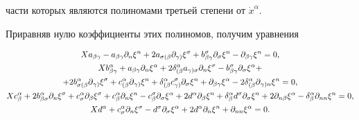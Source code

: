 части которых являются полиномами третьей степени от $\Dot x^\alpha$.


Приравняв нулю коэффициенты этих полиномов, получим уравнения


\begin{gather}


Xa_{\beta\gamma}-a_{\beta\gamma}\partial_n\xi^n


+2a_{\sigma(\beta}\partial_{\gamma)}\xi^\sigma


+b^\sigma_{\beta\gamma}\partial_\sigma\xi^n


-\partial_{\beta\gamma}\xi^n=0,\notag \\


%


Xb^{\alpha}_{\beta\gamma}+


a_{\beta\gamma}\partial_n\xi^{\alpha}+


2\delta^{\alpha}_{(\beta}a_{\gamma)\sigma}\partial_n\xi^\sigma-


b^{\sigma}_{\beta\gamma}\partial_{\sigma}\xi^{\alpha}+\notag \\


%


\label{b2}


+2b{}^\alpha_{\sigma(\beta}\partial{}_{\gamma)}\xi^\sigma+


c{}^{\alpha}_{(\beta}\partial{}_{\gamma)}\xi^n


+\delta{}^\alpha_{(\beta}c{}_{\gamma)}^{\sigma}\partial_{\sigma}\xi^n+


\partial_{\beta\gamma}\xi^{\alpha}


-2\delta{}^{\alpha}_{(\beta}\partial{}_{\gamma)n}\xi^n=0, \\


%


Xc^{\alpha}_{\beta}+2b^{\alpha}_{\beta\sigma}\partial_{n}\xi^{\sigma}+


c^{\alpha}_{\sigma}\partial_{\beta}\xi^{\sigma}+


c^{\alpha}_{\beta}\partial_{n}\xi^{n}-


c^{\sigma}_{\beta}\partial_{\sigma}\xi^{\alpha}


+2d^{\alpha}\partial_{\beta}\xi^{n}+


\delta^{\alpha}_{\beta}d^{\sigma}\partial_{\sigma}\xi^{n}+


2\partial_{n\beta}\xi^{\alpha}-


\delta^\alpha_\beta\partial_{nn}\xi^{n}=0,\notag \\


%


Xd^{\alpha}+c^{\alpha}_{\sigma}\partial_{n}\xi^{\sigma}-


d^{\sigma}\partial_{\sigma}\xi^{\alpha}


+2d^{\alpha}\partial_{n}\xi^{n}+\partial_{nn}\xi^{\alpha}=0.\notag


\end{gather}


